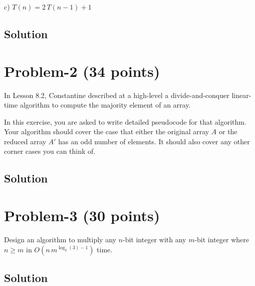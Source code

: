 \documentclass[11pt]{article}
\begin{document}
c) $T(n) = 2 \, T(n-1) + 1$


\subsection*{Solution}


\newpage
\section*{Problem-2 (34 points)}
\noindent
In Lesson 8.2, Constantine described at a high-level a divide-and-conquer linear-time algorithm to compute the majority element of an array. 

In this exercise, you are asked to write detailed pseudocode for that algorithm. Your algorithm should cover the case that either the original array $A$ or the reduced array $A'$ has an odd number of elements. It should also cover any other corner cases you can think of. 


\subsection*{Solution}

\newpage
\section*{Problem-3 (30 points)}
Design an algorithm to multiply any $n$-bit integer with any $m$-bit integer where $n \ge m$ in $O(n\, m^{\log_2(3) - 1})$ time.
 

\subsection*{Solution}
\end{document}
